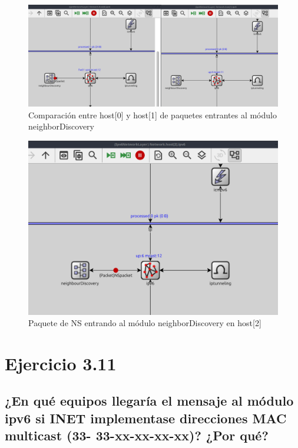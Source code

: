\begin{figure}[H]
    \centering
    \includegraphics[width=135mm, scale=0.75]{imaxes/ejercicio3_10_4.png}
    \caption{Comparación entre host[0] y host[1] de paquetes entrantes al módulo neighborDiscovery}
    \label{fig:ns_ipv6ND_host0host1}
\end{figure}

\begin{figure}[H]
    \centering
    \includegraphics[width=135mm, scale=0.75]{imaxes/ejercicio3_10_5.png}
    \caption{Paquete de NS entrando al módulo neighborDiscovery en host[2]}
    \label{fig:ns_ipv6ND_host2}
\end{figure}

\section{Ejercicio 3.11}
\subsection{¿En qué equipos llegaría el mensaje al módulo ipv6 si INET implementase direcciones MAC multicast (33-
33-xx-xx-xx-xx)? ¿Por qué?}

